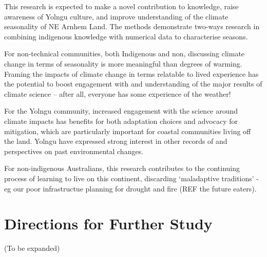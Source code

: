 This research is expected to make a novel contribution to knowledge, raise 
awareness of Yolngu culture, and improve understanding of the climate 
seasonality of NE Arnhem Land.  The methods demonstrate two-ways research in 
combining indigenous knowledge with numerical data to characterise seasons.

For non-technical communities, both Indigenous and non, discussing climate 
change in terms of seasonality is more meaningful than degrees of warming.  
Framing the impacts of climate change in terms relatable to lived experience 
has the potential to boost engagement with and understanding of the major 
results of climate science – after all, everyone has some experience of the 
weather!

For the Yolngu community, increased engagement with the science around climate 
impacts has benefits for both adaptation choices and advocacy for mitigation, 
which are particularly important for coastal communities living off the land.  
Yolngu have expressed strong interest in other records of and perspectives on 
past environmental changes.  

For non-indigenous Australians, this research contributes to the continuing 
process of learning to live on this continent, discarding `maladaptive traditions'
- eg our poor infrastructue planning for drought and fire (REF the future eaters).



\section{Directions for Further Study}
(To be expanded)

